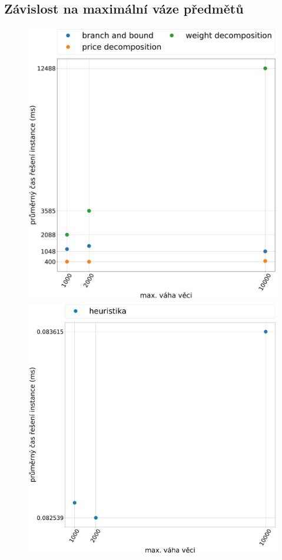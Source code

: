 \documentclass[11pt]{article}
\begin{document}
\subsection{Závislost na maximální váze předmětů}

\begin{figure}
	\centering
    \begin{minipage}[c]{0.49\textwidth}
        \centering\includegraphics[width=\textwidth]{img/WE.pdf} 
    \end{minipage}
    \begin{minipage}[c]{0.49\textwidth}
        \centering \includegraphics[width=\textwidth]{img/WH.pdf} 

\end{minipage}
\end{figure}
\end{document}
